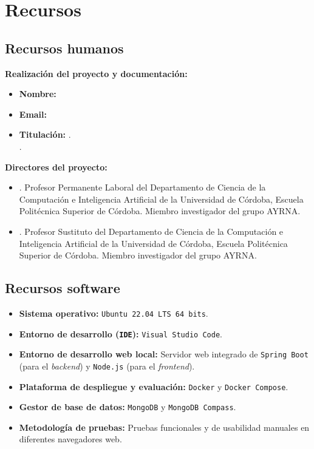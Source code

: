 \section{Recursos}
\label{sec:recursos}

\vspace{-0.15cm}

\subsection{Recursos humanos}

\textbf{Realización del proyecto y documentación:}
\begin{itemize}
    \item \textbf{Nombre:} \AutorTFG
    \item \textbf{Email:} \texttt{\EmailTFG}
    \item \textbf{Titulación:} \TitulacionTFG. \\\MencionTFG.
\end{itemize}

\textbf{Directores del proyecto:}
\begin{itemize}
    \item \DirectorUno. Profesor Permanente Laboral del Departamento de Ciencia de la Computación e Inteligencia Artificial de la Universidad de Córdoba, Escuela Politécnica Superior de Córdoba. Miembro investigador del grupo AYRNA.
    \item \DirectorDos. Profesor Sustituto del Departamento de Ciencia de la Computación e Inteligencia Artificial de la Universidad de Córdoba, Escuela Politécnica Superior de Córdoba. Miembro investigador del grupo AYRNA.
\end{itemize}

\vspace{-0.15cm}

\subsection{Recursos software}
\begin{itemize}
    \item \textbf{Sistema operativo:} \texttt{Ubuntu 22.04 LTS 64 bits}.
    \item \textbf{Entorno de desarrollo (\texttt{IDE}):} \texttt{Visual Studio Code}.
    \item \textbf{Entorno de desarrollo web local:} Servidor web integrado de \texttt{Spring Boot} (para el \textit{backend}) y \texttt{Node.js} (para el \textit{frontend}).
    \item \textbf{Plataforma de despliegue y evaluación:} \texttt{Docker} y \texttt{Docker Compose}.
    \item \textbf{Gestor de base de datos:} \texttt{MongoDB} y \texttt{MongoDB Compass}.
    \item \textbf{Metodología de pruebas:} Pruebas funcionales y de 
    usabilidad manuales en diferentes navegadores web.
\end{itemize}

